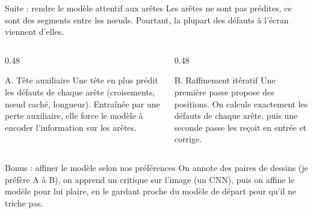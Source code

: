 \documentclass[aspectratio=169,11pt]{beamer}
\begin{document}
\begin{frame}{Suite : rendre le modèle attentif aux arêtes}
\small Les arêtes ne sont pas prédites, ce sont des segments entre les nœuds. Pourtant, la plupart des défauts à l'écran viennent d'elles.

\vspace{0.3cm}
\begin{columns}[T]
\begin{column}{0.48\textwidth}
\begin{block}{A. Tête auxiliaire}
\small Une tête en plus prédit les défauts de chaque arête (croisements, nœud caché, longueur). Entraînée par une perte auxiliaire, elle force le modèle à encoder l'information sur les arêtes.
\end{block}
\end{column}
\begin{column}{0.48\textwidth}
\begin{block}{B. Raffinement itératif}
\small Une première passe propose des positions. On calcule exactement les défauts de chaque arête, puis une seconde passe les reçoit en entrée et corrige.
\end{block}
\end{column}
\end{columns}
\end{frame}

\begin{frame}{Bonus : affiner le modèle selon nos préférences}
\small On annote des paires de dessins (\og je préfère A à B\fg{}), on apprend un critique sur l'image (un CNN), puis on affine le modèle pour lui plaire, en le gardant proche du modèle de départ pour qu'il ne triche pas.

\vspace{0.4cm}
\centering
{}
\end{frame}
\end{document}
